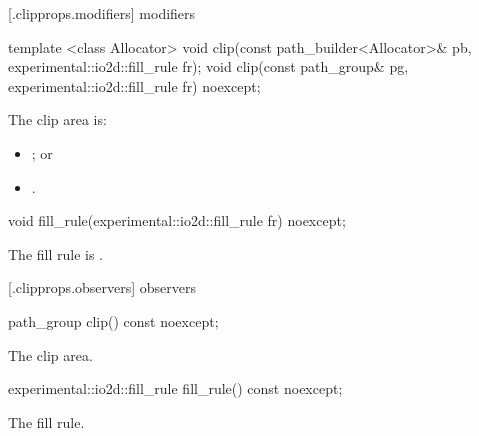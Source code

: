  [\iotwod.clipprops.modifiers] { modifiers}

%
\begin{itemdecl}
template <class Allocator>
void clip(const path_builder<Allocator>& pb, experimental::io2d::fill_rule fr);
void clip(const path_group& pg, experimental::io2d::fill_rule fr) noexcept;
\end{itemdecl}
\begin{itemdescr}
\pnum
\effects
The clip area is:
\begin{itemize}
\item {}; or
\item {}.
\end{itemize}
\end{itemdescr}

%
\begin{itemdecl}
void fill_rule(experimental::io2d::fill_rule fr) noexcept;
\end{itemdecl}
\begin{itemdescr}
\pnum
\effects
The fill rule is .
\end{itemdescr}

 [\iotwod.clipprops.observers] { observers}

%
\begin{itemdecl}
path_group clip() const noexcept;
\end{itemdecl}
\begin{itemdescr}
\pnum
\returns
The clip area.
\end{itemdescr}

%
\begin{itemdecl}
experimental::io2d::fill_rule fill_rule() const noexcept;
\end{itemdecl}
\begin{itemdescr}
\pnum
\returns
The fill rule.
\end{itemdescr}
